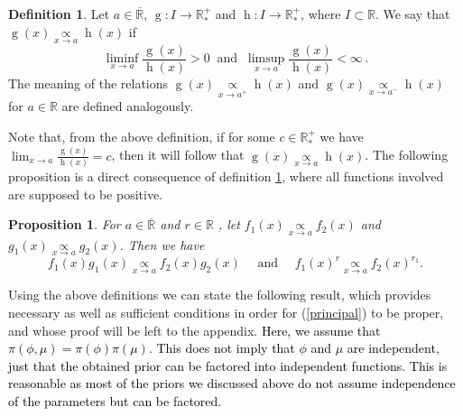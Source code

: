\documentclass[]{interact}
\newcommand{\f}{\operatorname}
\theoremstyle{plain}%
\newtheorem{proposition}[theorem]{Proposition}
\theoremstyle{definition}
\newtheorem{definition}[theorem]{Definition}
\theoremstyle{remark}
\begin{document}
\begin{definition}\label{definition1}
Let $a\in \mathbb{\overline{R}}$, $\f{g}:I\to\mathbb{R^+_*}$ and $\f{h}:I\to\mathbb{R^+_*}$, where $I\subset\mathbb{R}$. We say that $\f{g}(x)\underset{x\to a}{\propto} \f{h}(x)$ if
\begin{equation*}
\liminf_{x\to a} \frac{\f{g}(x)}{\f{h}(x)} > 0\ \mbox{ and }\ \limsup_{x\to a} \frac{\f{g}(x)}{\f{h}(x)} < \infty  \,.
\end{equation*}
The meaning of the relations $\f{g}(x)\underset{x\to a^+}{\propto} \f{h}(x)$ and $\f{g}(x)\underset{x\to a^-}{\propto} \f{h}(x)$ for $a\in \mathbb{R}$ are defined analogously.
\end{definition}

Note that, from the above definition, if for some $c\in \mathbb{R}^+_*$ we have $\lim_{x\to a} \frac{\f{g}(x)}{\f{h}(x)} = c$, then it will follow that $\f{g}(x)\underset{x\to a}{\propto} \f{h}(x)$. The following proposition is a direct consequence of definition \ref{definition1}, where all functions involved are supposed to be positive.

\begin{proposition}\label{properties} For $a\in\overline{\mathbb{R}}$ and $r\in\mathbb{R}$ , let $f_1(x)\underset{x\to a}{\propto} f_2(x)$ and $g_1(x)\underset{x\to a}{\propto} g_2(x)$. Then we have
\begin{equation*}
f_1(x)g_1(x)\underset{x\to a}{\propto}f_2(x)g_2(x) \quad \mbox{ and } \quad f_1(x)^r\underset{x\to a}{\propto}f_2(x)^{r_1}.
\end{equation*}

\end{proposition} 

Using the above definitions we can state the following result, which provides necessary as well as sufficient conditions in order for (\ref{principal}) to be proper, and whose proof will be left to the appendix. \textcolor{black}{Here, we assume that $\pi(\phi,\mu) = \pi(\phi)\pi(\mu)$. This does not imply that $\phi$ and $\mu$ are independent, just that the obtained prior can be factored into independent functions. This is reasonable as most of the priors we discussed above do not assume independence of the parameters but can be factored.}
\end{document}
